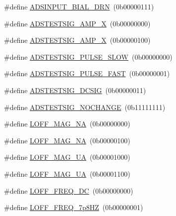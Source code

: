 \begin{DoxyCompactItemize}
\item 
\#define \hyperlink{group___definitions___a_d_s1299_ga773cfa5f9f7f724e5bd7e6dc567ac772}{A\+D\+S\+I\+N\+P\+U\+T\+\_\+\+B\+I\+A\+L\+\_\+\+D\+R\+N}~(0b00000111)
\item 
\#define \hyperlink{group___definitions___a_d_s1299_ga73acc481619d255e7652ccfa148f50a1}{A\+D\+S\+T\+E\+S\+T\+S\+I\+G\+\_\+\+A\+M\+P\+\_\+X}~(0b00000000)
\item 
\#define \hyperlink{group___definitions___a_d_s1299_ga512bb26913d49e4d6fc2c7f271b0964d}{A\+D\+S\+T\+E\+S\+T\+S\+I\+G\+\_\+\+A\+M\+P\+\_\+X}~(0b00000100)
\item 
\#define \hyperlink{group___definitions___a_d_s1299_ga6825c7210e0be635b9f9db381133900b}{A\+D\+S\+T\+E\+S\+T\+S\+I\+G\+\_\+\+P\+U\+L\+S\+E\+\_\+\+S\+L\+O\+W}~(0b00000000)
\item 
\#define \hyperlink{group___definitions___a_d_s1299_gadfb3a042d1cb163c324f7c2422a81bd0}{A\+D\+S\+T\+E\+S\+T\+S\+I\+G\+\_\+\+P\+U\+L\+S\+E\+\_\+\+F\+A\+S\+T}~(0b00000001)
\item 
\#define \hyperlink{group___definitions___a_d_s1299_gabbd58fa66fd5f8ccb4310e4f59afd3d9}{A\+D\+S\+T\+E\+S\+T\+S\+I\+G\+\_\+\+D\+C\+S\+I\+G}~(0b00000011)
\item 
\#define \hyperlink{group___definitions___a_d_s1299_ga7141f22cf9ee75a5a97d6230621ce273}{A\+D\+S\+T\+E\+S\+T\+S\+I\+G\+\_\+\+N\+O\+C\+H\+A\+N\+G\+E}~(0b11111111)
\item 
\#define \hyperlink{group___definitions___a_d_s1299_ga10347bce19f154a1f9efdcbb45aa0af8}{L\+O\+F\+F\+\_\+\+M\+A\+G\+\_\+N\+A}~(0b00000000)
\item 
\#define \hyperlink{group___definitions___a_d_s1299_gafd483c0197a6d292803e9ffa51bf11ef}{L\+O\+F\+F\+\_\+\+M\+A\+G\+\_\+N\+A}~(0b00000100)
\item 
\#define \hyperlink{group___definitions___a_d_s1299_ga5da349629444fdc460223637219ce572}{L\+O\+F\+F\+\_\+\+M\+A\+G\+\_\+U\+A}~(0b00001000)
\item 
\#define \hyperlink{group___definitions___a_d_s1299_gadc2a3347e2d38ae91587a60682fd1284}{L\+O\+F\+F\+\_\+\+M\+A\+G\+\_\+U\+A}~(0b00001100)
\item 
\#define \hyperlink{group___definitions___a_d_s1299_gad7df75a5d4ad6b65e5b56bb0fd7cd81e}{L\+O\+F\+F\+\_\+\+F\+R\+E\+Q\+\_\+\+D\+C}~(0b00000000)
\item 
\#define \hyperlink{group___definitions___a_d_s1299_gaecc7fd6b62148228d2657531feb87a2a}{L\+O\+F\+F\+\_\+\+F\+R\+E\+Q\+\_\+7p8\+H\+Z}~(0b00000001)
\item 

\end{DoxyCompactItemize}
